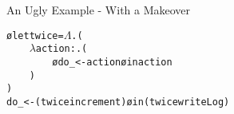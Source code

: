 
\begin{frame}{An Ugly Example - With a Makeover}
    \begin{alltt}
\o{let} twice = $\Lambda$ .(\\
~~~~$\lambda$ action: . (\\
~~~~~~~~\o{do} \_ <- action \o{in} action\\
~~~~)\\
)\\

do \_ <- (twice  increment) \o{in} (twice  writeLog)
\end{alltt}
\end{frame}